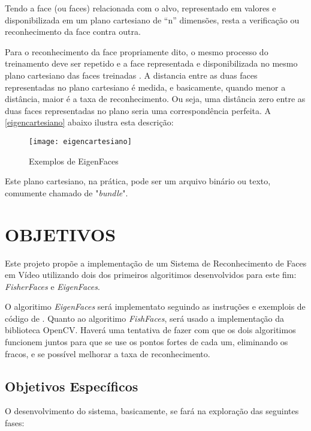 Tendo a face (ou faces) relacionada com o alvo, representado em valores e disponibilizada em um plano cartesiano de “n” dimensões, resta a verificação ou reconhecimento da face contra outra. 

Para o reconhecimento da face propriamente dito, o mesmo processo do treinamento deve ser repetido e a face representada e disponibilizada no mesmo plano cartesiano das faces treinadas \cite{drmathew_java_programming}. A distancia entre as duas faces representadas no plano cartesiano é medida, e basicamente, quando menor a distância, maior é a taxa de reconhecimento. Ou seja, uma distância zero entre as duas faces representadas no plano seria uma correspondência perfeita. A \autoref{eigencartesiano} abaixo ilustra esta descrição:

\begin{figure}[h]
	\centering
	\texttt{[image: eigencartesiano]}
	\caption{Exemplos de EigenFaces}
	\label{eigencartesiano}
\end{figure}

Este plano cartesiano, na prática, pode ser um arquivo binário ou texto, comumente chamado de "\textit{bundle}".

\section{OBJETIVOS}\label{sec:objetivos}
Este projeto propõe a implementação de um Sistema de Reconhecimento de Faces em Vídeo utilizando dois dos primeiros algoritimos desenvolvidos para este fim: \textit{FisherFaces} e \textit{EigenFaces}.

O algoritimo \textit{EigenFaces} será implementato seguindo as instruções e exemplois de código de \cite{drmathew_java_programming}. Quanto ao algoritimo \textit{FishFaces}, será usado a implementação da biblioteca OpenCV. Haverá uma tentativa de fazer com que os dois algoritimos funcionem juntos para que se use os pontos fortes de cada um, eliminando os fracos, e se possível melhorar a taxa de reconhecimento. 

\subsection{Objetivos Específicos}\label{sec:organizacao-trabalho}

O desenvolvimento do sistema, basicamente, se fará na exploração das seguintes fases:

